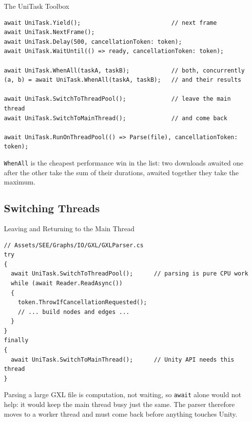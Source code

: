 \begin{frame}[fragile]{The UniTask Toolbox}
  \begin{lstlisting}[basicstyle=\scriptsize\ttfamily]
await UniTask.Yield();                          // next frame
await UniTask.NextFrame();
await UniTask.Delay(500, cancellationToken: token);
await UniTask.WaitUntil(() => ready, cancellationToken: token);

await UniTask.WhenAll(taskA, taskB);            // both, concurrently
(a, b) = await UniTask.WhenAll(taskA, taskB);   // and their results

await UniTask.SwitchToThreadPool();             // leave the main thread
await UniTask.SwitchToMainThread();             // and come back

await UniTask.RunOnThreadPool(() => Parse(file), cancellationToken: token);
  \end{lstlisting}
  \vspace{1ex}

  \texttt{WhenAll} is the cheapest performance win in the list: two downloads
  awaited one after the other take the sum of their durations, awaited
  together they take the maximum.
\end{frame}

\subsection{Switching Threads}

\begin{frame}[fragile]{Leaving and Returning to the Main Thread}
  \begin{lstlisting}[basicstyle=\scriptsize\ttfamily]
// Assets/SEE/Graphs/IO/GXL/GXLParser.cs
try
{
  await UniTask.SwitchToThreadPool();      // parsing is pure CPU work
  while (await Reader.ReadAsync())
  {
    token.ThrowIfCancellationRequested();
    // ... build nodes and edges ...
  }
}
finally
{
  await UniTask.SwitchToMainThread();      // Unity API needs this thread
}
  \end{lstlisting}
  \vspace{1ex}

  Parsing a large GXL file is computation, not waiting, so \texttt{await}
  alone would not help: it would keep the main thread busy just the same. The
  parser therefore moves to a worker thread and must come back before anything
  touches Unity.
\end{frame}


